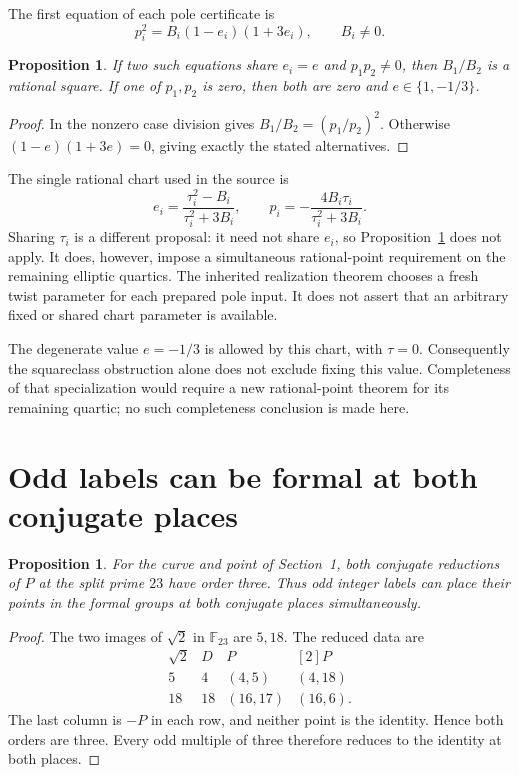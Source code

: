 \documentclass[11pt,a4paper]{article}
\newtheorem{proposition}[theorem]{Proposition}
\theoremstyle{remark}\newtheorem{remark}[theorem]{Remark}
\begin{document}
The first equation of each pole certificate is
\[
                  p_i^2=B_i(1-e_i)(1+3e_i),\qquad B_i\ne0.
\]

\begin{proposition}\label{prop:shared-e}
If two such equations share $e_i=e$ and $p_1p_2\ne0$, then
$B_1/B_2$ is a rational square.  If one of $p_1,p_2$ is zero,
then both are zero and $e\in\{1,-1/3\}$.
\end{proposition}
\begin{proof}
In the nonzero case division gives $B_1/B_2=(p_1/p_2)^2$.
Otherwise $(1-e)(1+3e)=0$, giving exactly the stated alternatives.
\end{proof}

The single rational chart used in the source is
\[
 e_i=\frac{\tau_i^2-B_i}{\tau_i^2+3B_i},\qquad
 p_i=-\frac{4B_i\tau_i}{\tau_i^2+3B_i}.
\]
Sharing $\tau_i$ is a different proposal: it need not share $e_i$,
so Proposition~\ref{prop:shared-e} does not apply.  It does,
however, impose a simultaneous rational-point requirement on
the remaining elliptic quartics.  The inherited realization
theorem chooses a fresh twist parameter for each prepared pole
input.  It does not assert that an arbitrary fixed or shared
chart parameter is available.

The degenerate value $e=-1/3$ is allowed by this chart, with
$\tau=0$.  Consequently the squareclass obstruction alone does
not exclude fixing this value.  Completeness of that specialization
would require a new rational-point theorem for its remaining
quartic; no such completeness conclusion is made here.

\section{Odd labels can be formal at both conjugate places}

\begin{proposition}\label{prop:odd-example}
For the curve and point of Section~1, both conjugate reductions
of $P$ at the split prime $23$ have order three.  Thus odd
integer labels can place their points in the formal groups
at both conjugate places simultaneously.
\end{proposition}
\begin{proof}
The two images of $\sqrt2$ in $\mathbb F_{23}$ are $5,18$.
The reduced data are
\[
\begin{array}{c|c|c|c}
 \sqrt2&D&P&[2]P\\\hline
 5&4&(4,5)&(4,18)\\
 18&18&(16,17)&(16,6).
\end{array}
\]
The last column is $-P$ in each row, and neither point is the
identity.  Hence both orders are three.  Every odd multiple
of three therefore reduces to the identity at both places.
\end{proof}
\end{document}
